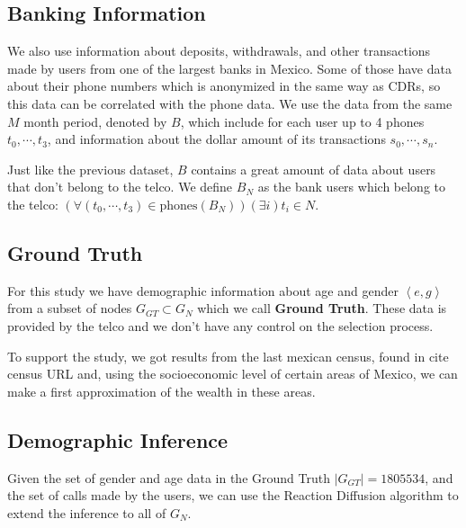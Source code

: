 \subsection{Banking Information}

We also use information about deposits, withdrawals, and other transactions made by users from one of the largest banks in Mexico. Some of those have data about their phone numbers which is anonymized in the same way as CDRs, so this data can be correlated with the phone data. We use the data from the same \( M \) month period, denoted by \( B \), which include for each user up to 4 phones \( t_0, \cdots, t_3 \), and information about the dollar amount of its transactions \( s_0, \cdots, s_n \).

Just like the previous dataset, \( B \) contains a great amount of data about users that don't belong to the telco. We define \( B_N \) as the bank users which belong to the telco: \( \left( \forall \left( t_0, \cdots, t_3 \right) \in \text{phones}\left( B_N \right) \right) \left( \exists i \right) t_i \in N \).

\subsection{Ground Truth}

For this study we have demographic information about age and gender \( \left< e, g \right> \) from a subset of nodes \( G_{GT} \subset G_N \) which we call \textbf{Ground Truth}. These data is provided by the telco and we don't have any control on the selection process.

To support the study, we got results from the last mexican census, found in {cite census URL} and, using the socioeconomic level of certain areas of Mexico, we can make a first approximation of the wealth in these areas.

\subsection{Demographic Inference}

Given the set of gender and age data in the Ground Truth \( \left| G_{GT} \right| = 1805534 \), and the set of calls made by the users, we can use the Reaction Diffusion algorithm \cite{brea2014} to extend the inference to all of \( G_N \).

